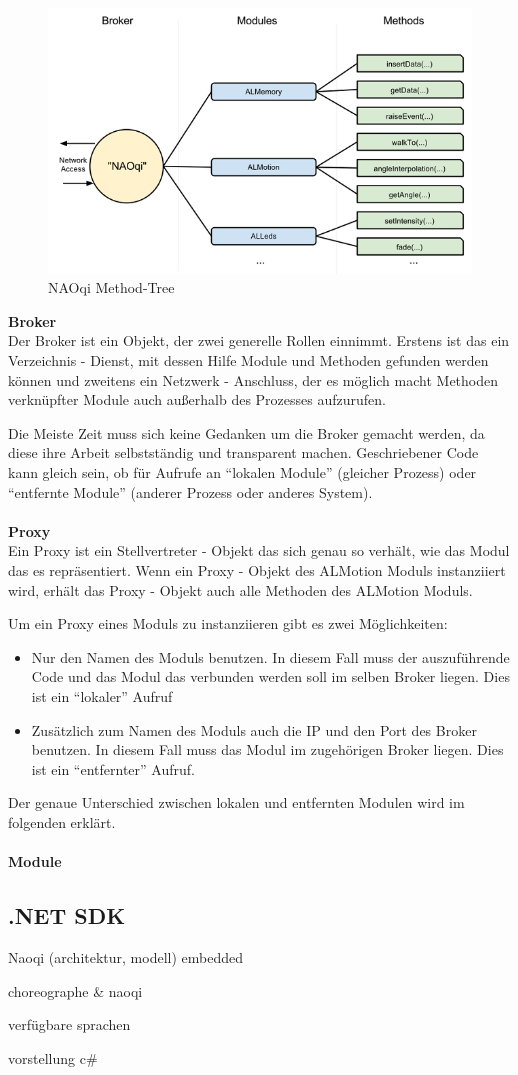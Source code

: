 \begin{figure}[H]						
	\centering							
	\includegraphics[scale=0.8]{Bilder/naoqi_process2.PNG}
	\caption{NAOqi Method-Tree}						
	\label{f:naoqi_broker2}						
\end{figure}
\noindent
\textbf{Broker}
\\
Der Broker ist ein Objekt, der zwei generelle Rollen einnimmt. Erstens ist das ein Verzeichnis - Dienst, mit dessen Hilfe Module und Methoden gefunden werden können und zweitens ein Netzwerk - Anschluss, der es möglich macht Methoden verknüpfter Module auch außerhalb des Prozesses aufzurufen.

Die Meiste Zeit muss sich keine Gedanken um die Broker gemacht werden, da diese ihre Arbeit selbstständig und transparent machen. Geschriebener Code kann gleich sein, ob für Aufrufe an "`lokalen Module"' (gleicher Prozess) oder "`entfernte Module"' (anderer Prozess oder anderes System).
\\
\\
\textbf{Proxy}
\\
Ein Proxy ist ein Stellvertreter - Objekt das sich genau so verhält, wie das Modul das es repräsentiert. Wenn ein Proxy - Objekt des ALMotion Moduls instanziiert wird, erhält das Proxy - Objekt auch alle Methoden des ALMotion Moduls.

Um ein Proxy eines Moduls zu instanziieren gibt es zwei Möglichkeiten: 
\begin{itemize}
\item Nur den Namen des Moduls benutzen. In diesem Fall muss der auszuführende Code und das Modul das verbunden werden soll im selben Broker liegen. Dies ist ein "`lokaler"' Aufruf
\item Zusätzlich zum Namen des Moduls auch die IP und den Port des Broker benutzen. In diesem Fall muss das Modul im zugehörigen Broker liegen. Dies ist ein "`entfernter"' Aufruf.
\end{itemize}
Der genaue Unterschied zwischen lokalen und entfernten Modulen wird im folgenden erklärt.
\\
\\
\textbf{Module}
\\


\subsection{.NET SDK}

Naoqi (architektur, modell)
	embedded
	
choreographe \& naoqi	


verfügbare sprachen


vorstellung c\#
